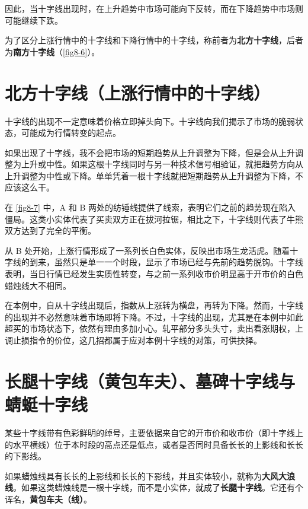 \begin{tcolorbox}
    因此，当十字线出现时，在上升趋势中市场可能向下反转，而在下降趋势中市场则可能继续下跌。
\end{tcolorbox}

为了区分上涨行情中的十字线和下降行情中的十字线，称前者为\textbf{北方十字线}，后者为\textbf{南方十字线}（\autoref{fig8-6}）。

\section{北方十字线（上涨行情中的十字线）}
十字线的出现不一定意味着价格立即掉头向下。十字线向我们揭示了市场的脆弱状态，可能成为行情转变的起点。

如果出现了十字线，我不会把市场的短期趋势从上升调整为下降，但是会从上升调整为上升或中性。如果这根十字线同时与另一种技术信号相验证，就把趋势方向从上升调整为中性或下降。单单凭着一根十字线就把短期趋势从上升调整为下降，不应该这么干。

在 \autoref{fig8-7} 中，A 和 B 两处的纺锤线提供了线索，表明它们之前的趋势现在陷入僵局。这类小实体代表了买卖双方正在拔河拉锯，相比之下，十字线则代表了牛熊双方达到了完全的平衡。

从 B 处开始，上涨行情形成了一系列长白色实体，反映出市场生龙活虎。随着十字线的到来，虽然只是单一一个时段，显示了市场已经与先前的趋势脱钩。十字线表明，当日行情已经发生实质性转变，与之前一系列收市价明显高于开市价的白色蜡烛线大不相同。

在本例中，自从十字线出现后，指数从上涨转为横盘，再转为下降。然而，十字线的出现并不必然意味着市场即将下降。不过，十字线的出现，尤其是在本例中如此超买的市场状态下，依然有理由多加小心。轧平部分多头头寸，卖出看涨期权，上调止损指令的价位，这几招都属于应对本例十字线的对策，可供抉择。

\section{长腿十字线（黄包车夫）、墓碑十字线与蜻蜓十字线}
某些十字线带有色彩鲜明的绰号，主要依据来自它的开市价和收市价（即十字线上的水平横线）位于本时段的高点还是低点，或者是否同时具备长长的上影线和长长的下影线。

如果蜡烛线具有长长的上影线和长长的下影线，并且实体较小，就称为\textbf{大风大浪线}。如果这类蜡烛线是一根十字线，而不是小实体，就成了\textbf{长腿十字线}。它还有个诨名，\textbf{黄包车夫（线）}。

